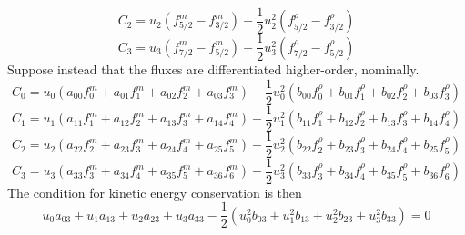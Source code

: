 \documentclass[12pt]{article}
\numberwithin{equation}{section}
\numberwithin{figure}{section}
\begin{document}
\begin{equation}
C_2 = u_2\left(f_{5/2}^{m} - f_{3/2}^{m}\right) - \frac{1}{2}u_2^2\left(f_{5/2}^\rho - f_{3/2}^\rho\right)
\end{equation}
\begin{equation}
C_3 = u_3\left(f_{7/2}^{m} - f_{5/2}^{m}\right) - \frac{1}{2}u_3^2\left(f_{7/2}^\rho - f_{5/2}^\rho\right)
\end{equation}
Suppose instead that the fluxes are differentiated higher-order, nominally.
\begin{equation}
C_0 = u_0\left(a_{00}f_{0}^{m} + a_{01}f_{1}^{m} + a_{02}f_{2}^{m} + a_{03}f_{3}^{m}\right)
- \frac{1}{2}u_0^2\left(b_{00}f_{0}^{\rho} + b_{01}f_{1}^{\rho} + b_{02}f_{2}^{\rho} + b_{03}f_{3}^{\rho}\right)
\end{equation}
\begin{equation}
C_1 = u_1\left(a_{11}f_{1}^{m} + a_{12}f_{2}^{m} + a_{13}f_{3}^{m} + a_{14}f_{4}^{m}\right)
- \frac{1}{2}u_1^2\left(b_{11}f_{1}^{\rho} + b_{12}f_{2}^{\rho} + b_{13}f_{3}^{\rho} + b_{14}f_{4}^{\rho}\right)
\end{equation}
\begin{equation}
C_2 = u_2\left(a_{22}f_{2}^{m} + a_{23}f_{3}^{m} + a_{24}f_{4}^{m} + a_{25}f_{5}^{m}\right)
- \frac{1}{2}u_2^2\left(b_{22}f_{2}^{\rho} + b_{23}f_{3}^{\rho} + b_{24}f_{4}^{\rho} + b_{25}f_{5}^{\rho}\right)
\end{equation}
\begin{equation}
C_3 = u_3\left(a_{33}f_{3}^{m} + a_{34}f_{4}^{m} + a_{35}f_{5}^{m} + a_{36}f_{6}^{m}\right)
- \frac{1}{2}u_3^2\left(b_{33}f_{3}^{\rho} + b_{34}f_{4}^{\rho} + b_{35}f_{5}^{\rho} + b_{36}f_{6}^{\rho}\right)
\end{equation}
The condition for kinetic energy conservation is then
\begin{equation}
u_0a_{03} + u_1a_{13} + u_2a_{23} + u_3a_{33} - \frac{1}{2}(u_0^2b_{03} + u_1^2b_{13} + u_2^2b_{23} + u_3^2b_{33}) = 0
\end{equation}
\end{document}
